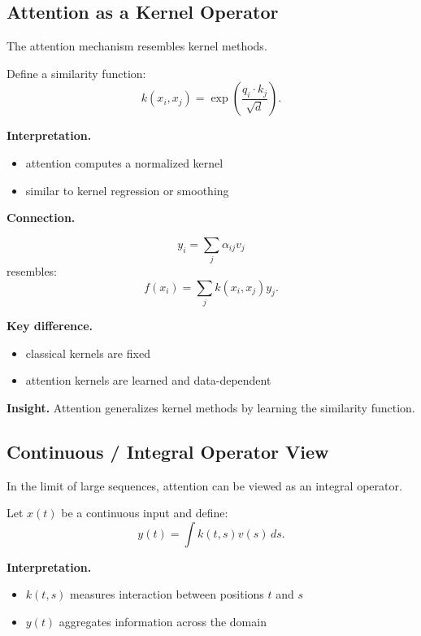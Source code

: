 \subsection{Attention as a Kernel Operator}

The attention mechanism resembles kernel methods.

\medskip

\noindent
Define a similarity function:
\[
k(x_i, x_j) = \exp\left( \frac{q_i \cdot k_j}{\sqrt{d}} \right).
\]

\medskip

\noindent
\textbf{Interpretation.}

\begin{itemize}
    \item attention computes a normalized kernel
    \item similar to kernel regression or smoothing
\end{itemize}

\medskip

\noindent
\textbf{Connection.}

\[
y_i = \sum_j \alpha_{ij} v_j
\]
resembles:
\[
f(x_i) = \sum_j k(x_i, x_j) y_j.
\]

\medskip

\noindent
\textbf{Key difference.}

\begin{itemize}
    \item classical kernels are fixed
    \item attention kernels are learned and data-dependent
\end{itemize}

\medskip

\noindent
\textbf{Insight.}  
Attention generalizes kernel methods by learning the similarity function.

\subsection{Continuous / Integral Operator View}

In the limit of large sequences, attention can be viewed as an integral operator.

\medskip

\noindent
Let $x(t)$ be a continuous input and define:
\[
y(t) = \int k(t,s) v(s) \, ds.
\]

\medskip

\noindent
\textbf{Interpretation.}

\begin{itemize}
    \item $k(t,s)$ measures interaction between positions $t$ and $s$
    \item $y(t)$ aggregates information across the domain
\end{itemize}


